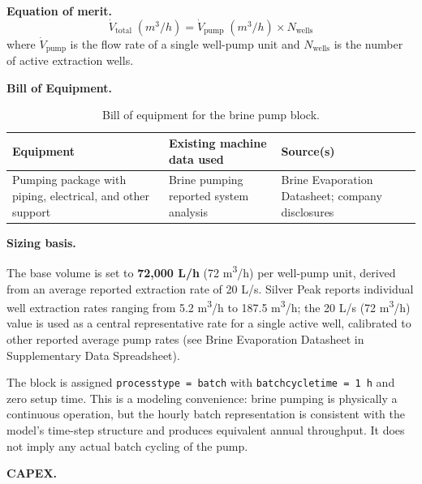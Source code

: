 \documentclass{article}
\renewcommand\_{\textunderscore\allowbreak}
\begin{document}
\medskip
\noindent\textbf{Equation of merit.}\quad
\[
  \dot{V}_\text{total}\;(\si{m^3/h}) = \dot{V}_\text{pump}\;(\si{m^3/h}) \times N_\text{wells}
\]
where $\dot{V}_\text{pump}$ is the flow rate of a single well-pump unit and $N_\text{wells}$ is the number of active extraction wells.

\medskip
\noindent\textbf{Bill of Equipment.}\quad

\begin{table}[h!]
\caption{Bill of equipment for the brine pump block.}
\label{tab:c-equip-evappond}
\centering
\begin{tabular}{>{\raggedright\arraybackslash}p{5.2cm}
                >{\raggedright\arraybackslash}p{4cm}
                >{\raggedright\arraybackslash}p{4.5cm}}
\toprule
\textbf{Equipment} & \textbf{Existing machine data used} & \textbf{Source(s)} \\
\midrule
Pumping package with piping, electrical, and other support & Brine pumping reported system analysis & Brine Evaporation Datasheet; company disclosures \\
\bottomrule
\end{tabular}
\end{table}

\medskip
\noindent\textbf{Sizing basis.}\quad

The base volume is set to \textbf{72,000 L/h} (72 \si{m^3/h}) per well-pump unit, derived from an average reported extraction rate of 20 L/s. Silver Peak reports individual well extraction rates ranging from 5.2 \si{m^3/h} to 187.5 \si{m^3/h}; the 20 L/s (72 \si{m^3/h}) value is used as a central representative rate for a single active well, calibrated to other reported average pump rates (see Brine Evaporation Datasheet in Supplementary Data Spreadsheet).

The block is assigned \texttt{process\_type = batch} with \texttt{batch\_cycle\_time = 1 h} and zero setup time. This is a modeling convenience: brine pumping is physically a continuous operation, but the hourly batch representation is consistent with the model's time-step structure and produces equivalent annual throughput. It does not imply any actual batch cycling of the pump.

\medskip
\noindent\textbf{CAPEX.}\quad
\end{document}
